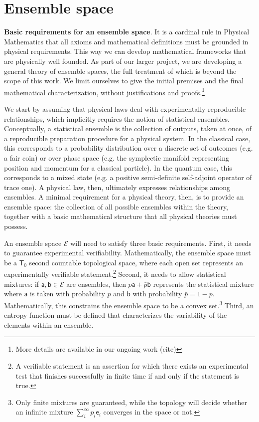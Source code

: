 \documentclass[10pt,twocolumn, nofootinbib]{revtex4-2}
\newcommand{\ens}[1][e] {\mathsf{#1}} %
\newcommand{\Ens}[1][E] {\mathcal{#1}} %
\begin{document}
\section{Ensemble space}

\textbf{Basic requirements for an ensemble space}. It is a cardinal rule in Physical Mathematics that all axioms and mathematical definitions must be grounded in physical requirements. This way we can develop mathematical frameworks that are physically well founded. As part of our larger project, we are developing a general theory of ensemble spaces, the full treatment of which is beyond the scope of this work. We limit ourselves to give the initial premises and the final mathematical characterization, without justifications and proofs.\footnote{More details are available in our ongoing work (cite)}

We start by assuming that physical laws deal with experimentally reproducible relationships, which implicitly requires the notion of statistical ensembles. Conceptually, a statistical ensemble is the collection of outputs, taken at once, of a reproducible preparation procedure for a physical system. In the classical case, this corresponds to a probability distribution over a discrete set of outcomes (e.g. a fair coin) or over phase space (e.g. the symplectic manifold representing position and momentum for a classical particle). In the quantum case, this corresponds to a mixed state (e.g. a positive semi-definite self-adjoint operator of trace one). A physical law, then, ultimately expresses relationships among ensembles. A minimal requirement for a physical theory, then, is to provide an ensemble space: the collection of all possible ensembles within the theory, together with a basic mathematical structure that all physical theories must possess.

An ensemble space $\Ens$ will need to satisfy three basic requirements. First, it needs to guarantee experimental verifiability. Mathematically, the ensemble space must be a $\mathsf{T}_0$ second countable topological space, where each open set represents an experimentally verifiable statement.\footnote{A verifiable statement is an assertion for which there exists an experimental test that finishes successfully in finite time if and only if the statement is true.} Second, it needs to allow statistical mixtures: if $\ens[a],\ens[b] \in \Ens$ are ensembles, then $p \ens[a] + \bar{p} \ens[b]$ represents the statistical mixture where $\ens[a]$ is taken with probability $p$ and $\ens[b]$ with probability $\bar{p} = 1 - p$. Mathematically, this constrains the ensemble space to be a convex set.\footnote{Only finite mixtures are guaranteed, while the topology will decide whether an infinite mixture $\sum_{i}^{\infty} p_i \ens_i$ converges in the space or not.} Third, an entropy function must be defined that characterizes the variability of the elements within an ensemble.
\end{document}

